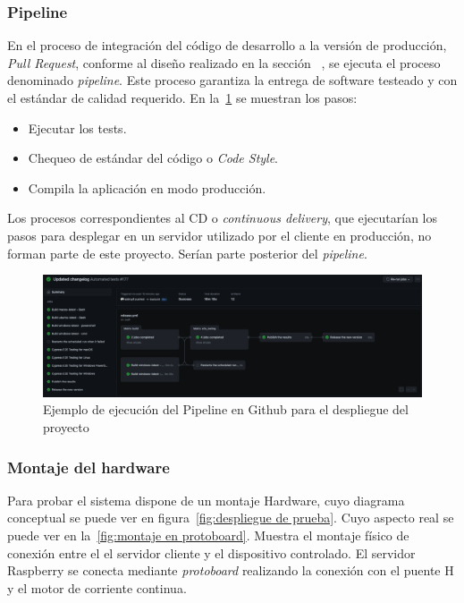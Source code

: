 
\subsubsection{Pipeline}

En el proceso de integración del código de desarrollo a la versión de producción, \textit{Pull Request}, conforme al diseño realizado en la sección ~, se ejecuta el proceso denominado \textit{pipeline}.
Este proceso garantiza la entrega de software testeado y con el estándar de calidad requerido.
En la~\cref{fig:githubActions} se muestran los pasos:

\begin{itemize}
    \item Ejecutar los tests.
    \item Chequeo de estándar del código o \textit{Code Style}.
    \item Compila la aplicación en modo producción.
\end{itemize}

Los procesos correspondientes al CD o \textit{continuous delivery}, que ejecutarían los pasos para desplegar en un servidor utilizado por el cliente en producción, no forman parte de este proyecto.
Serían parte posterior del \textit{pipeline}.

\begin{figure}[H]
    \centering
    \includegraphics[height=0.2\textheight]{./part/Ejecucion/Seguimiento/PuestaAPunto/img/githubPipelines}
    \caption{Ejemplo de ejecución del Pipeline en Github para el despliegue del proyecto}\label{fig:githubActions}
\end{figure}

\subsubsection{Montaje del hardware}

Para probar el sistema dispone de un montaje Hardware, cuyo diagrama conceptual se puede ver en  figura~\cref{fig:despliegue de prueba}.
Cuyo aspecto real se puede ver en la~\cref{fig:montaje en protoboard}.
Muestra el montaje físico de conexión entre el el servidor cliente y el dispositivo controlado.
El servidor Raspberry se conecta mediante \textit{protoboard} realizando la conexión con el puente H y el motor de corriente continua.

